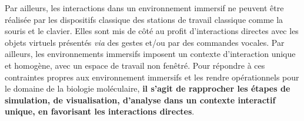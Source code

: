 

Par ailleurs, les interactions dans un environnement immersif ne peuvent être réalisée par les dispositifs classique des stations de travail classique comme la souris et le clavier.
Elles sont mis de côté au profit d'interactions directes avec les objets virtuels présentés \textit{via} des gestes et/ou par des commandes vocales. Par ailleurs, les environnements immersifs imposent un contexte d'interaction unique et homogène, avec un espace de travail non fenêtré. Pour répondre à ces contraintes propres aux environnement immersifs et les rendre opérationnels pour le domaine de la biologie moléculaire, \textbf{il s'agit de rapprocher les étapes de simulation, de visualisation, d'analyse dans un contexte interactif unique, en favorisant les interactions directes}.






